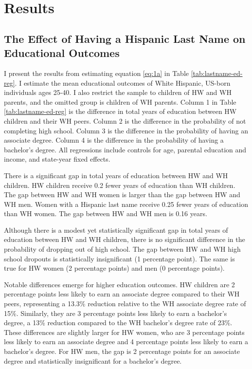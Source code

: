 \section{Results}\label{sec:results}

\subsection{The Effect of Having a Hispanic Last Name on Educational Outcomes}

I present the results from estimating equation \ref{eq:1a} in Table \ref{tab:lastname-ed-reg}. I estimate the mean educational outcomes of White Hispanic, US-born individuals ages 25-40. I also restrict the sample to children of HW and WH parents, and the omitted group is children of WH parents. Column 1 in Table \ref{tab:lastname-ed-reg} is the difference in total years of education between HW children and their WH peers. Column 2 is the difference in the probability of not completing high school. Column 3 is the difference in the probability of having an associate degree. Column 4 is the difference in the probability of having a bachelor’s degree. All regressions include controls for age, parental education and income, and state-year fixed effects.

There is a significant gap in total years of education between HW and WH children. HW children receive 0.2 fewer years of education than WH children. The gap between HW and WH women is larger than the gap between HW and WH men. Women with a Hispanic last name receive 0.25 fewer years of education than WH women. The gap between HW and WH men is 0.16 years.

Although there is a modest yet statistically significant gap in total years of education between HW and WH children, there is no significant difference in the probability of dropping out of high school. The gap between HW and WH high school dropouts is statistically insignificant (1 percentage point). The same is true for HW women (2 percentage points) and men (0 percentage points).

Notable differences emerge for higher education outcomes. HW children are 2 percentage points less likely to earn an associate degree compared to their WH peers, representing a 13.3\% reduction relative to the WH associate degree rate of 15\%. Similarly, they are 3 percentage points less likely to earn a bachelor's degree, a 13\% reduction compared to the WH bachelor's degree rate of 23\%. These differences are slightly larger for HW women, who are 3 percentage points less likely to earn an associate degree and 4 percentage points less likely to earn a bachelor’s degree. For HW men, the gap is 2 percentage points for an associate degree and statistically insignificant for a bachelor’s degree.

